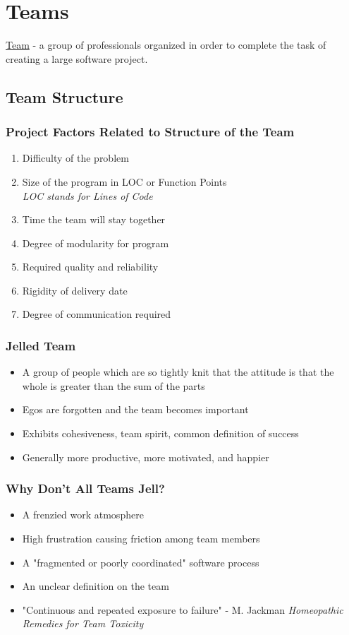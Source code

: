 \documentclass{report}
\begin{document}
	\chapter{Teams}
		\underline{Team} - a group of professionals organized in order to complete the task of creating a large software project.
		\section{Team Structure}
			\subsection{Project Factors Related to Structure of the Team}
				\begin{enumerate}
					\item Difficulty of the problem
					\item Size of the program in LOC or Function Points\\
						\textit{LOC stands for Lines of Code}
					\item Time the team will stay together
					\item Degree of modularity for program
					\item Required quality and reliability
					\item Rigidity of delivery date
					\item Degree of communication required
				\end{enumerate}
			\subsection{Jelled Team}
				\begin{itemize}
					\item A group of people which are so tightly knit that the attitude is that the whole is greater than the sum of the parts
					\item Egos are forgotten and the team becomes important
					\item Exhibits cohesiveness, team spirit, common definition of success
					\item Generally more productive, more motivated, and happier
				\end{itemize}
			\subsection{Why Don't All Teams Jell?}
				\begin{itemize}
					\item A frenzied work atmosphere
					\item High frustration causing friction among team members
					\item A "fragmented or poorly coordinated" software process
					\item An unclear definition on the team
					\item "Continuous and repeated exposure to failure" - M. Jackman \textit{Homeopathic Remedies for Team Toxicity}
				\end{itemize}
\end{document}
